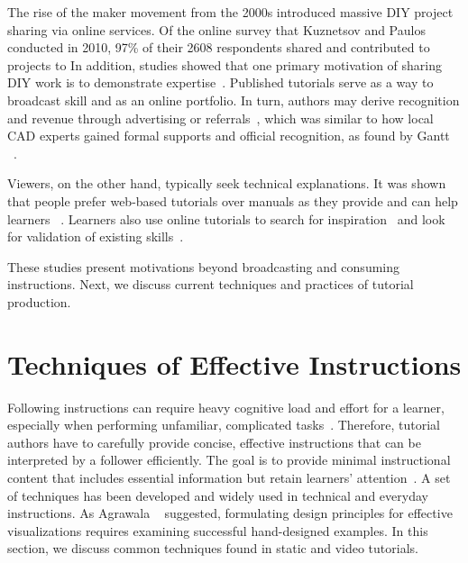 The rise of the maker movement from the 2000s introduced massive DIY project sharing via online services. Of the online survey that Kuznetsov and Paulos~\cite{Kuznetsov:2010:REA:1868914.1868950} conducted in 2010, 97\% of their 2608 respondents shared and contributed to projects to  In addition, studies showed that one primary motivation of sharing DIY work is to demonstrate expertise~\cite{Torrey:2007he,Kuznetsov:2010:REA:1868914.1868950}. Published tutorials serve as a way to broadcast skill and as an online portfolio.
%
In turn, authors may derive recognition and revenue through advertising or referrals~\cite{Lafreniere:2012tl}, which was similar to how local CAD experts gained formal supports and official recognition, as found by Gantt \ea{}~\cite{Gantt:1992:GGP:142750.142767}.

Viewers, on the other hand, typically seek technical explanations. It was shown that people prefer web-based tutorials over manuals as they provide  and can help learners ~\cite{BenLafreniere:2013ux}.
%
Learners also use online tutorials to search for inspiration~\cite{Torrey:2009fc} and look for validation of existing skills~\cite{Lafreniere:2012tl}.

These studies present motivations beyond broadcasting and consuming instructions. Next, we discuss current techniques and practices of tutorial production.



\section{Techniques of Effective Instructions}
\label{background_techniques}

Following instructions can require heavy cognitive load and effort for a learner, especially when performing unfamiliar, complicated tasks~\cite{sweller1998cognitive,sweller1988cognitive}. Therefore, tutorial authors have to carefully provide concise, effective instructions that can be interpreted by a follower efficiently. The goal is to provide minimal instructional content that includes essential information but retain learners' attention~\cite{Black:1986:KMI:29933.275623}.
%
A set of techniques has been developed and widely used in technical and everyday instructions.
%
As Agrawala \ea{}~\cite{Agrawala:2011:DPV:1924421.1924439} suggested, formulating design principles for effective visualizations requires examining successful hand-designed examples. In this section, we discuss common techniques found in static and video tutorials.

